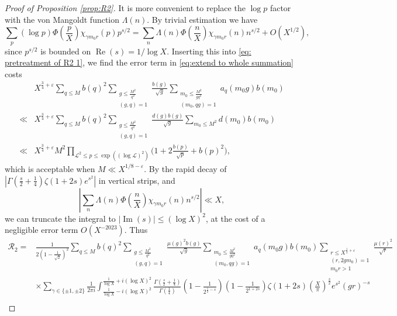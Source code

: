 \documentclass[12pt,reqno]{amsart}
\numberwithin{equation}{section}
\theoremstyle{plain}
\theoremstyle{definition}
\theoremstyle{remark}
\renewcommand{\Re}{\operatorname{Re}}
\renewcommand{\Im}{\operatorname{Im}}
\begin{document}
\begin{proof}[Proof of Proposition \ref{prop:R2}]
It is more convenient to replace the $\log p$ factor with the von Mangoldt function $\Lambda(n)$. By trivial estimation we have
\begin{equation}\label{eq:extend to whole summation}
\sum_p(\log p) \Phi\left(\frac{p}{X}\right) \chi_{\gamma m_0 r}(p) p^{s / 2}=\sum_n \Lambda(n) \Phi\left(\frac{n}{X}\right) \chi_{\gamma m_0 r}(n) n^{s / 2}+O\left(X^{1 / 2}\right),
\end{equation}
since $p^{s/2}$ is bounded on $\Re(s) = 1 / \log X$.
Inserting this into \eqref{eq: pretreatment of R2 1}, we find the error term in \eqref{eq:extend to whole summation} costs
\begin{align*}
&X^{\frac{3}{4}+\varepsilon}\sum_{q\leq M} b(q)^2 \sum_{\substack{g\leq \frac{M^2}{q^2}\\ (g,q)=1}} \frac{b(g)}{ \sqrt{g}} \sum_{\substack{m_0 \leq \frac{M^2}{gq^2} \\ (m_0,qg)=1}} a_q(m_0g) b(m_0)\\
\ll&X^{\frac{3}{4}+\varepsilon}\sum_{q\leq M} b(q)^2 \sum_{\substack{g\leq \frac{M^2}{q^2}\\ (g,q)=1}} \frac{d(g)b(g)}{ \sqrt{g}} \sum_{m_0 \leq M^2} d(m_0)b(m_0)\\
\ll&X^{\frac{3}{4}+\varepsilon}M^2\prod_{\mathcal{L}^2\leq p \leq \exp((\log \mathcal{L})^2)}\bigg(1+2\frac{b(p)}{\sqrt{p}}+b(p)^2\bigg),
\end{align*}
which is acceptable when $M\ll X^{1/8-\varepsilon}$.
By the rapid decay of $|\Gamma(\frac{s}{2}+\frac{1}{4})\zeta(1+2s)
e^{s^2}|$ in vertical strips, and
$$|\sum_n \Lambda(n) \Phi\left(\frac{n}{X}\right) \chi_{\gamma m_0 r}(n) n^{s / 2}|
\ll X,$$
we can truncate the integral to $|\Im(s)| \leq (\log X)^2$, at the cost of a negligible error term $O(X^{-2023})$.
Thus
\begin{equation}\label{eq: pretreatment of R2 2}
  \begin{split}
  \mathcal{R}_2=
  &\frac{1}{2\left( 1-\frac{1}{\sqrt{2}}\right)^2} \sum_{q\leq M} b(q)^2 \sum_{\substack{g\leq \frac{M^2}{q^2}\\ (g,q)=1}} \frac{{\mu (g)}^2b(g)}{ \sqrt{g}} \sum_{\substack{m_0 \leq \frac{M^2}{gq^2} \\ (m_0,qg)=1}} a_q(m_0g)b(m_0) \sum_{\substack{r \leq X^{\frac{1}{2}+\varepsilon } \\ (r,2gm_0)=1 \\ m_0r>1}}
   \frac{{\mu (r)}^2}{ \sqrt{r}}   \\
  &\times \sum_{\gamma \in \{\pm 1, \pm 2\}} \frac{1}{2\pi i} \int_{\frac{1}{\log X}-i(\log X)^2}^{\frac{1}{\log X}+i(\log X)^2} \frac{\Gamma(\frac{s}{2}+\frac{1}{4})}{\Gamma(\frac{1}{4})} \left( 1-\frac{1}{2^{\frac{1}{2}-s}}\right)\left(1 - \frac{1}{2^{1+2s}}\right)\zeta(1+2s)\left(\frac{X}{\pi}\right)^{\frac{s}{2}}e^{s^2} \left( gr\right)^{-s} \\

\end{split}
\end{equation}
\end{proof}
\end{document}

